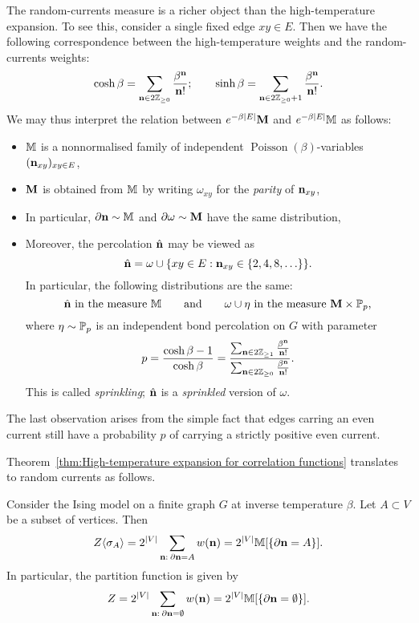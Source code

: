 The random-currents measure is a richer object than the high-temperature expansion.
To see this, consider a single fixed edge $xy\in E$.
Then we have the following correspondence between the high-temperature weights
and the random-currents weights:
\[
    \cosh\beta = \sum_{\n\in 2\Z_{\geq 0}} \frac{\beta^\n}{\n!}
    ;
    \qquad
    \sinh\beta = \sum_{\n\in 2\Z_{\geq 0}+1} \frac{\beta^\n}{\n!}.
\]
We may thus interpret the relation between $e^{-\beta|E|}\bfM$ and $e^{-\beta|E|}\M$ as follows:
\begin{itemize}
    \item $\M$ is a nonnormalised family of independent $\operatorname{Poisson}(\beta)$-variables $(\n_{xy})_{xy\in E}$,
    \item $\bfM$ is obtained from $\M$ by writing $\omega_{xy}$ for the \emph{parity} of $\n_{xy}$,
    \item In particular, $\partial\n\sim\M$ and $\partial\omega\sim\bfM$ have the same distribution,
    \item Moreover, the percolation $\hat\n$ may be viewed as
    \[
        \hat\n = \omega \cup\{xy\in E: \n_{xy}\in\{2,4,8,\ldots\}\}.
    \]
    In particular, the following distributions are the same:
    \begin{equation}
        \label{eq:equivalence}
        \text{$\hat\n$ in the measure $\M$}
        \qquad
        \text{and}
        \qquad
        \text{$\omega\cup\eta$ in the measure $\bfM\times\P_{p}$,}
    \end{equation}
    where $\eta\sim\P_p$ is an independent bond percolation on $G$
    with parameter
    \[
        p
        =\frac{\cosh\beta-1}{\cosh\beta}
        =\frac{
            \sum_{\n\in 2\Z_{\geq 1}} \frac{\beta^\n}{\n!}
        }{
            \sum_{\n\in 2\Z_{\geq 0}} \frac{\beta^\n}{\n!}
        }
        .
    \]
    This is called \emph{sprinkling};
    $\hat\n$ is a \emph{sprinkled} version of $\omega$.
\end{itemize}

The last observation arises from the simple fact that edges carring an even current
still have a probability $p$ of carrying a strictly positive even current.

Theorem~\ref{thm:High-temperature expansion for correlation functions}
translates to random currents as follows.

\begin{theorem}
    \label{thm:current_representation_of_correlation_functions}
    Consider the Ising model on a finite graph $G$ at inverse temperature $\beta$.
    Let $A\subset V$ be a subset of vertices.
    Then
    \[
        Z\langle\sigma_A\rangle
        =2^{|V|}\sum_{\n:\:\partial\n=A}
        w(\n)
        =
        2^{|V|}\M[\{\partial\n=A\}].
    \]
    In particular, the partition function is given by
    \[
        Z=2^{|V|}\sum_{\n:\:\partial\n=\emptyset}
        w(\n)
        =
        2^{|V|}\M[\{\partial\n=\emptyset\}].
    \]
\end{theorem}

